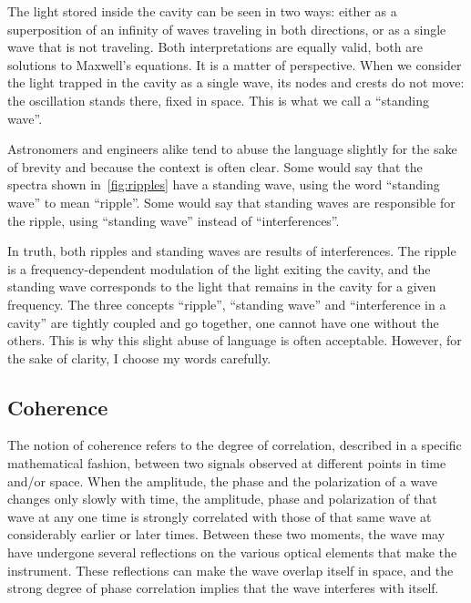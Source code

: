 The light stored inside the cavity can be seen in two ways:
either as a superposition of an infinity of waves traveling in both directions,
or as a single wave that is not traveling.
Both interpretations are equally valid, both are solutions to Maxwell's equations.
It is a matter of perspective.
When we consider the light trapped in the cavity as a single wave, its nodes and crests do not move: the oscillation stands there, fixed in space.
This is what we call a ``standing wave''.

Astronomers and engineers alike tend to abuse the language slightly for the sake of brevity and because the context is often clear.
Some would say that the spectra shown in~\cref{fig:ripples} have a standing wave, using the word ``standing wave'' to mean ``ripple''.
Some would say that standing waves are responsible for the ripple, using ``standing wave'' instead of ``interferences''.

In truth, both ripples and standing waves are results of interferences.
The ripple is a frequency-dependent modulation of the light exiting the cavity, and the standing wave corresponds to the light that remains in the cavity for a given frequency.
The three concepts ``ripple'', ``standing wave'' and ``interference in a cavity'' are tightly coupled and go together, one cannot have one without the others.
This is why this slight abuse of language is often acceptable.
However, for the sake of clarity, I choose my words carefully.



\subsection{Coherence}

The notion of coherence refers to the degree of correlation, described in a specific mathematical fashion, between two signals observed at different points in time and/or space.
When the amplitude, the phase and the polarization of a wave changes only slowly with time, the amplitude, phase and polarization of that wave at any one time is strongly correlated with those of that same wave at considerably earlier or later times.
Between these two moments, the wave may have undergone several reflections on the various optical elements that make the instrument.
These reflections can make the wave overlap itself in space, and the strong degree of phase correlation implies that the wave interferes with itself.

